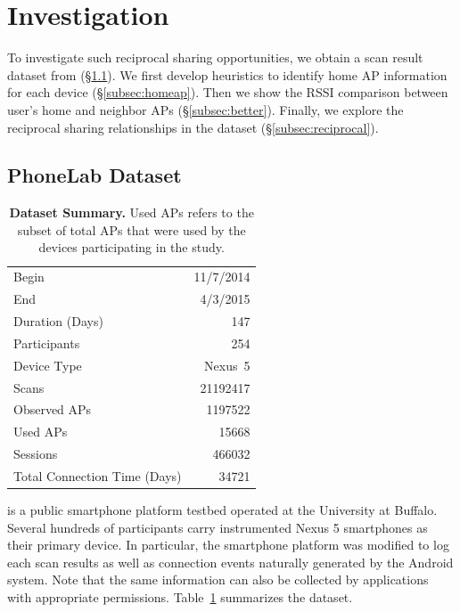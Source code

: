 \newpage
\clearpage

\section{Investigation}
\label{sec:investigation}

To investigate such reciprocal sharing opportunities, we obtain a \wifi{} scan
result dataset from \PhoneLab{} (\S\ref{subsec:phonelab}). We first develop
heuristics to identify home AP information for each device
(\S\ref{subsec:homeap}). Then we show the RSSI comparison between user's home
and neighbor APs (\S\ref{subsec:better}). Finally, we explore the reciprocal
sharing relationships in the dataset (\S\ref{subsec:reciprocal}).

\subsection{PhoneLab \wifi{} Dataset}
\label{subsec:phonelab}

\begin{table}[t]
  \begin{tabularx}{\columnwidth}{Xr}
    \toprule
    Begin & 11/7/2014 \\ 
    End & 4/3/2015 \\ 
    Duration (Days) & 147 \\ \midrule
    Participants & 254 \\
    Device Type & Nexus~5 \\ \midrule
    Scans & \num{21192417} \\
    Observed APs & \num{1197522} \\
    Used APs & \num{15668} \\ \midrule
    \wifi{} Sessions & \num{466032} \\
    Total Connection Time (Days) & \num{34721} \\
    \bottomrule
  \end{tabularx}
  \caption{\textbf{\PhoneLab{} \wifi{} Dataset Summary.} Used APs refers to the
  subset of total APs that were used by the devices participating in the study.}
  \label{tab:summary}
\end{table}

\PhoneLab{}\cite{phonelab-sensemine13} is a public smartphone platform testbed
operated at the University at Buffalo. Several hundreds of participants carry
instrumented Nexus 5 smartphones as their primary device. In particular, the
smartphone platform was modified to log each \wifi{} scan results as well as
connection events naturally generated by the Android system. Note that the same
information can also be collected by applications with appropriate permissions.
Table~\ref{tab:summary} summarizes the \PhoneLab{} \wifi{} dataset.

